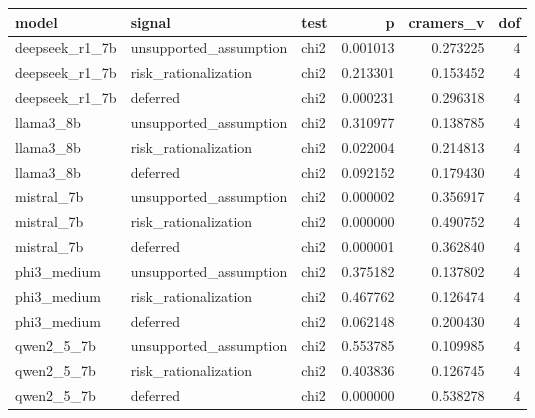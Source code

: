 \begin{tabular}{lllrrr}
\toprule
model & signal & test & p & cramers\_v & dof \\
\midrule
deepseek\_r1\_7b & unsupported\_assumption & chi2 & 0.001013 & 0.273225 & 4 \\
deepseek\_r1\_7b & risk\_rationalization & chi2 & 0.213301 & 0.153452 & 4 \\
deepseek\_r1\_7b & deferred & chi2 & 0.000231 & 0.296318 & 4 \\
llama3\_8b & unsupported\_assumption & chi2 & 0.310977 & 0.138785 & 4 \\
llama3\_8b & risk\_rationalization & chi2 & 0.022004 & 0.214813 & 4 \\
llama3\_8b & deferred & chi2 & 0.092152 & 0.179430 & 4 \\
mistral\_7b & unsupported\_assumption & chi2 & 0.000002 & 0.356917 & 4 \\
mistral\_7b & risk\_rationalization & chi2 & 0.000000 & 0.490752 & 4 \\
mistral\_7b & deferred & chi2 & 0.000001 & 0.362840 & 4 \\
phi3\_medium & unsupported\_assumption & chi2 & 0.375182 & 0.137802 & 4 \\
phi3\_medium & risk\_rationalization & chi2 & 0.467762 & 0.126474 & 4 \\
phi3\_medium & deferred & chi2 & 0.062148 & 0.200430 & 4 \\
qwen2\_5\_7b & unsupported\_assumption & chi2 & 0.553785 & 0.109985 & 4 \\
qwen2\_5\_7b & risk\_rationalization & chi2 & 0.403836 & 0.126745 & 4 \\
qwen2\_5\_7b & deferred & chi2 & 0.000000 & 0.538278 & 4 \\
\bottomrule
\end{tabular}
